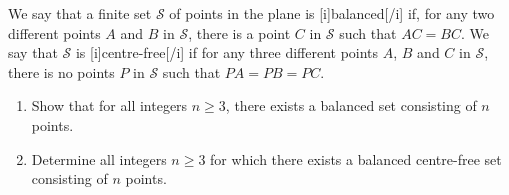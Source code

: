 We say that a finite set $\mathcal{S}$ of points in the plane is [i]balanced[/i] if, for any two different points $A$ and $B$ in $\mathcal{S}$, there is a point $C$ in $\mathcal{S}$ such that $AC=BC$. We say that $\mathcal{S}$ is [i]centre-free[/i] if for any three different points $A$, $B$ and $C$ in $\mathcal{S}$, there is no points $P$ in $\mathcal{S}$ such that $PA=PB=PC$.

\begin{enumerate}[label = (\alph*)]
	\item Show that for all integers $n\ge 3$, there exists a balanced set consisting of $n$ points.
	\item Determine all integers $n\ge 3$ for which there exists a balanced centre-free set consisting of $n$ points.
\end{enumerate}
